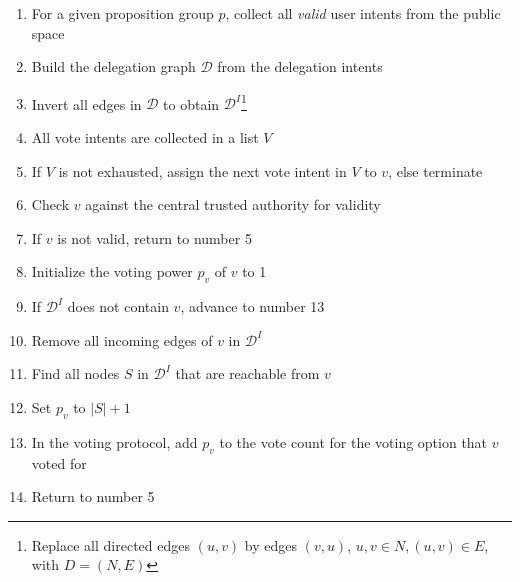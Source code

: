 \begin{enumerate}
  \item For a given proposition group $p$, collect all \textit{valid} user intents from the public space
  \item Build the delegation graph $\mathcal{D}$ from the delegation intents
  \item Invert all edges in $\mathcal{D}$ to obtain $\mathcal{D}^I$\footnote{Replace all directed edges $(u,v)$ by edges $(v,u)$, $u,v \in N, (u,v) \in E$, with $D=(N,E)$}
  \item All vote intents are collected in a list $V$
  \item If $V$ is not exhausted, assign the next vote intent in $V$ to $v$, else terminate
  \item Check $v$ against the central trusted authority for validity 
  \item If $v$ is not valid, return to number 5
  \item Initialize the voting power $p_v$ of $v$ to 1
  \item If $\mathcal{D}^I$ does not contain $v$, advance to number 13
  \item Remove all incoming edges of $v$ in $\mathcal{D}^I$
  \item Find all nodes $S$ in $\mathcal{D}^I$ that are reachable from $v$
  \item Set $p_v$ to $|S|+1$
  \item In the voting protocol, add $p_v$ to the vote count for the voting option that $v$ voted for
  \item Return to number 5
\end{enumerate}


